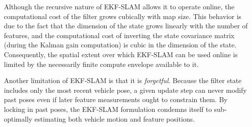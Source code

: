 \documentclass[letterpaper, 10 pt, conference]{ieeeconf}  %
\begin{document}
Although the recursive nature of EKF-SLAM allows it to operate online, the computational cost of the filter grows cubically with map size.
This behavior is due to the fact that the dimension of the state grows linearly with the number of features, and the computational cost of inverting the state covariance matrix (during the Kalman gain computation) is cubic in the dimension of the state.
Consequently, the spatial extent over which EKF-SLAM can be used online is limited by the necessarily finite compute envelope available to it.

Another limitation of EKF-SLAM is that it is \textit{forgetful}.
Because the filter state includes only the most recent vehicle pose, a given update step can never modify past poses even if later feature measurements ought to constrain them.
By locking in past poses, the EKF-SLAM formulation condemns itself to sub-optimally estimating both vehicle motion and feature positions.

\end{document}
